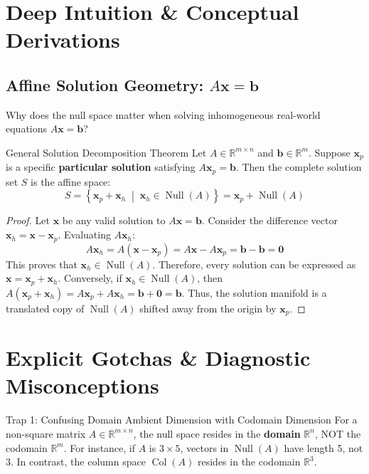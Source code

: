 \section{Deep Intuition \& Conceptual Derivations}

\subsection{Affine Solution Geometry: $A\mathbf{x} = \mathbf{b}$}

Why does the null space matter when solving inhomogeneous real-world equations $A\mathbf{x} = \mathbf{b}$?
\begin{theorembox}{General Solution Decomposition Theorem}
Let $A \in \mathbb{R}^{m \times n}$ and $\mathbf{b} \in \mathbb{R}^m$. Suppose $\mathbf{x}_p$ is a specific \textbf{particular solution} satisfying $A\mathbf{x}_p = \mathbf{b}$. Then the complete solution set $S$ is the affine space:
\begin{equation}
S = \left\{ \mathbf{x}_p + \mathbf{x}_h \;\middle|\; \mathbf{x}_h \in \operatorname{Null}(A) \right\} = \mathbf{x}_p + \operatorname{Null}(A)
\end{equation}
\end{theorembox}

\begin{proof}
Let $\mathbf{x}$ be any valid solution to $A\mathbf{x} = \mathbf{b}$. Consider the difference vector $\mathbf{x}_h = \mathbf{x} - \mathbf{x}_p$.
Evaluating $A\mathbf{x}_h$:
\begin{equation*}
A\mathbf{x}_h = A(\mathbf{x} - \mathbf{x}_p) = A\mathbf{x} - A\mathbf{x}_p = \mathbf{b} - \mathbf{b} = \mathbf{0}
\end{equation*}
This proves that $\mathbf{x}_h \in \operatorname{Null}(A)$. Therefore, every solution can be expressed as $\mathbf{x} = \mathbf{x}_p + \mathbf{x}_h$.
Conversely, if $\mathbf{x}_h \in \operatorname{Null}(A)$, then $A(\mathbf{x}_p + \mathbf{x}_h) = A\mathbf{x}_p + A\mathbf{x}_h = \mathbf{b} + \mathbf{0} = \mathbf{b}$.
Thus, the solution manifold is a translated copy of $\operatorname{Null}(A)$ shifted away from the origin by $\mathbf{x}_p$.
\end{proof}

\section{Explicit Gotchas \& Diagnostic Misconceptions}

\begin{trapbox}{Trap 1: Confusing Domain Ambient Dimension with Codomain Dimension}
For a non-square matrix $A \in \mathbb{R}^{m \times n}$, the null space resides in the \textbf{domain} $\mathbb{R}^n$, NOT the codomain $\mathbb{R}^m$. For instance, if $A$ is $3 \times 5$, vectors in $\operatorname{Null}(A)$ have length 5, not 3. In contrast, the column space $\operatorname{Col}(A)$ resides in the codomain $\mathbb{R}^3$.
\end{trapbox}

